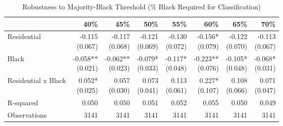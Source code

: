 \begin{table}[h]
\centering
\caption{Robustness to Majority-Black Threshold (\% Black Required for Classification)}
\label{tab:robustness/mblack_threshold}
\begin{threeparttable}
\begin{tabular*}{1.0\textwidth}{@{\extracolsep{\fill}}l*{7}{r}}
\toprule
 & 40\% & 45\% & 50\% & 55\% & 60\% & 65\% & 70\% \\
\midrule
Residential & \makecell[tr]{-0.115 \\ (0.067)} & \makecell[tr]{-0.117 \\ (0.068)} & \makecell[tr]{-0.121 \\ (0.069)} & \makecell[tr]{-0.130 \\ (0.072)} & \makecell[tr]{-0.156{*} \\ (0.079)} & \makecell[tr]{-0.122 \\ (0.070)} & \makecell[tr]{-0.113 \\ (0.067)} \\
Black & \makecell[tr]{-0.058{**} \\ (0.021)} & \makecell[tr]{-0.062{**} \\ (0.023)} & \makecell[tr]{-0.079{*} \\ (0.033)} & \makecell[tr]{-0.117{*} \\ (0.048)} & \makecell[tr]{-0.223{**} \\ (0.076)} & \makecell[tr]{-0.105{*} \\ (0.048)} & \makecell[tr]{-0.068{*} \\ (0.031)} \\
Residential x Black & \makecell[tr]{0.052{*} \\ (0.025)} & \makecell[tr]{0.057 \\ (0.030)} & \makecell[tr]{0.073 \\ (0.041)} & \makecell[tr]{0.113 \\ (0.061)} & \makecell[tr]{0.227{*} \\ (0.107)} & \makecell[tr]{0.108 \\ (0.066)} & \makecell[tr]{0.071 \\ (0.047)} \\
R-squared & 0.050 & 0.050 & 0.051 & 0.052 & 0.055 & 0.050 & 0.049 \\
Observations & 3141 & 3141 & 3141 & 3141 & 3141 & 3141 & 3141 \\
\bottomrule
\end{tabular*}
\begin{tablenotes}[flushleft]
\footnotesize

\end{tablenotes}
\end{threeparttable}
\end{table}
